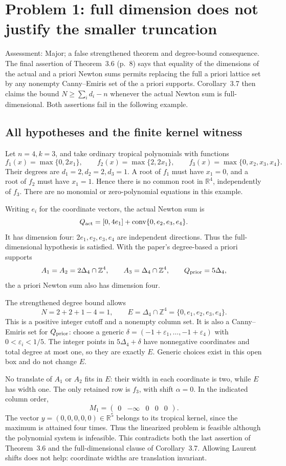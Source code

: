 \documentclass[10pt]{article}
\begin{document}
\section*{Problem 1: full dimension does not justify the smaller truncation}
Assessment: Major; a false strengthened theorem and degree-bound consequence. The final assertion of Theorem 3.6 (p. 8) says that equality of the dimensions of the actual and a priori Newton sums permits replacing the full a priori lattice set by any nonempty Canny–Emiris set of the a priori supports. Corollary 3.7 then claims the bound \(N\ge\sum_i d_i-n\) whenever the actual Newton sum is full-dimensional. Both assertions fail in the following example.\par
\subsection*{All hypotheses and the finite kernel witness}
Let \(n=4,k=3\), and take ordinary tropical polynomials with functions \[f_1(x)=\max\{0,2x_1\},\qquad
 f_2(x)=\max\{2,2x_1\},\qquad
 f_3(x)=\max\{0,x_2,x_3,x_4\}.\] Their degrees are \(d_1=2,d_2=2,d_3=1\). A root of \(f_1\) must have \(x_1=0\), and a root of \(f_2\) must have \(x_1=1\). Hence there is no common root in \(\mathbb R^4\), independently of \(f_3\). There are no monomial or zero-polynomial equations in this example.\par
Writing \(e_i\) for the coordinate vectors, the actual Newton sum is \[Q_{\rm act}=[0,4e_1]+\operatorname{conv}\{0,e_2,e_3,e_4\}.\] It has dimension four: \(2e_1,e_2,e_3,e_4\) are independent directions. Thus the full-dimensional hypothesis is satisfied. With the paper’s degree-based a priori supports \[A_1=A_2=2\Delta_4\cap\mathbb Z^4,\qquad
 A_3=\Delta_4\cap\mathbb Z^4,\qquad
 Q_{\rm prior}=5\Delta_4,\] the a priori Newton sum also has dimension four.\par
The strengthened degree bound allows \[N=2+2+1-4=1,\qquad
 E=\Delta_4\cap\mathbb Z^4=\{0,e_1,e_2,e_3,e_4\}.\] This is a positive integer cutoff and a nonempty column set. It is also a Canny–Emiris set for \(Q_{\rm prior}\): choose a generic \(\delta=(-1+\varepsilon_1,\ldots,-1+\varepsilon_4)\) with \(0<\varepsilon_i<1/5\). The integer points in \(5\Delta_4+\delta\) have nonnegative coordinates and total degree at most one, so they are exactly \(E\). Generic choices exist in this open box and do not change \(E\).\par
No translate of \(A_1\) or \(A_2\) fits in \(E\): their width in each coordinate is two, while \(E\) has width one. The only retained row is \(f_3\), with shift \(\alpha=0\). In the indicated column order, \[M_1=\begin{pmatrix}0&-\infty&0&0&0\end{pmatrix}.\] The vector \(y=(0,0,0,0,0)\in\mathbb R^5\) belongs to its tropical kernel, since the maximum is attained four times. Thus the linearized problem is feasible although the polynomial system is infeasible. This contradicts both the last assertion of Theorem 3.6 and the full-dimensional clause of Corollary 3.7. Allowing Laurent shifts does not help: coordinate widths are translation invariant.\par
\end{document}
